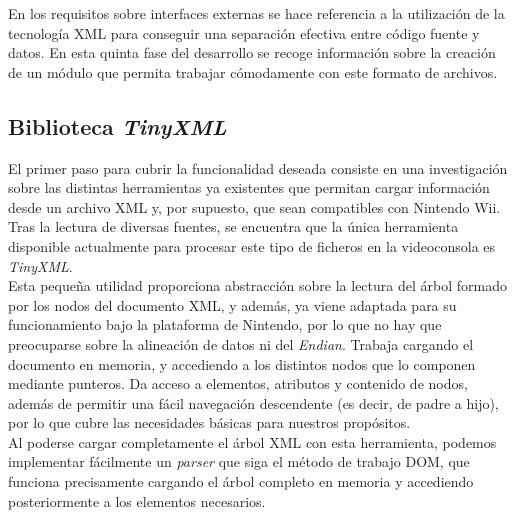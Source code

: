 



En los requisitos sobre interfaces externas se hace referencia a la utilización de la tecnología XML para conseguir una separación efectiva entre código fuente y datos. En esta quinta fase del desarrollo se recoge información sobre la creación de un módulo que permita trabajar cómodamente con este formato de archivos.

\subsection{Biblioteca \emph{TinyXML}}

El primer paso para cubrir la funcionalidad deseada consiste en una investigación sobre las distintas herramientas ya existentes que permitan cargar información desde un archivo XML y, por supuesto, que sean compatibles con Nintendo Wii. Tras la lectura de diversas fuentes, se encuentra que la única herramienta disponible actualmente para procesar este tipo de ficheros en la videoconsola es \emph{TinyXML}.\\

Esta pequeña utilidad proporciona abstracción sobre la lectura del árbol formado por los nodos del documento XML, y además, ya viene adaptada para su funcionamiento bajo la plataforma de Nintendo, por lo que no hay que preocuparse sobre la alineación de datos ni del \emph{Endian}. Trabaja cargando el documento en memoria, y accediendo a los distintos nodos que lo componen mediante punteros. Da acceso a elementos, atributos y contenido de nodos, además de permitir una fácil navegación descendente (es decir, de padre a hijo), por lo que cubre las necesidades básicas para nuestros propósitos.\\

Al poderse cargar completamente el árbol XML con esta herramienta, podemos implementar fácilmente un \emph{parser} que siga el método de trabajo DOM, que funciona precisamente cargando el árbol completo en memoria y accediendo posteriormente a los elementos necesarios.

